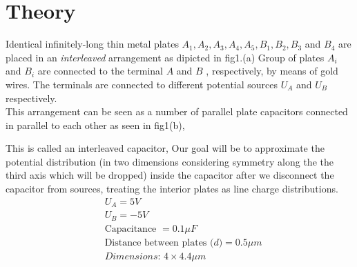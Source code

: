 \section{Theory}
Identical infinitely-long thin metal plates $A_1,A_2,A_3,A_4,A_5,B_1,B_2,B_3 $ and $B_4$ are placed in an \textit{interleaved} arrangement as dipicted in fig1.(a) Group of plates $A_i$ and $B_i$ are connected to the terminal $A$ and $B$ , respectively, by means of gold wires. The terminals are connected to different potential sources $U_A$ and $U_B$ respectively. \\
This arrangement can be seen as a number of parallel plate capacitors connected in parallel to each other as seen in fig1(b),



This is called an interleaved capacitor, Our goal will be to approximate the potential distribution (in two dimensions considering symmetry along the the third axis which will be dropped) inside the capacitor after we disconnect the capacitor from sources, treating the interior plates as line charge distributions.
\begin{align*}
    &U_A = 5V \\
    &U_B = -5V \\
    &\text{Capacitance } = 0.1\mu F\\
    &\text{Distance between plates ($d$)} = 0.5\mu m \\
    &\textit{Dimensions: } 4 \times 4.4 \mu m  
\end{align*}


